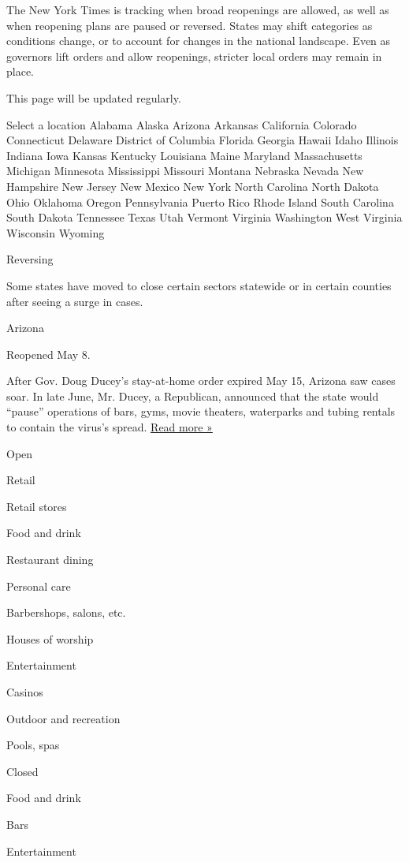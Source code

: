 The New York Times is tracking when broad reopenings are allowed, as
well as when reopening plans are paused or reversed. States may shift
categories as conditions change, or to account for changes in the
national landscape. Even as governors lift orders and allow reopenings,
stricter local orders may remain in place.

This page will be updated regularly.

Select a location Alabama Alaska Arizona Arkansas California Colorado
Connecticut Delaware District of Columbia Florida Georgia Hawaii Idaho
Illinois Indiana Iowa Kansas Kentucky Louisiana Maine Maryland
Massachusetts Michigan Minnesota Mississippi Missouri Montana Nebraska
Nevada New Hampshire New Jersey New Mexico New York North Carolina North
Dakota Ohio Oklahoma Oregon Pennsylvania Puerto Rico Rhode Island South
Carolina South Dakota Tennessee Texas Utah Vermont Virginia Washington
West Virginia Wisconsin Wyoming

Reversing

Some states have moved to close certain sectors statewide or in certain
counties after seeing a surge in cases.

Arizona

Reopened May 8.

After Gov. Doug Ducey's stay-at-home order expired May 15, Arizona saw
cases soar. In late June, Mr. Ducey, a Republican, announced that the
state would ``pause'' operations of bars, gyms, movie theaters,
waterparks and tubing rentals to contain the virus's spread.
\href{https://www.azcentral.com/story/news/local/arizona-health/2020/07/23/watch-live-ducey-provide-arizona-covid-19-update/5490927002/}{Read
more »}

Open

Retail

Retail stores

Food and drink

Restaurant dining

Personal care

Barbershops, salons, etc.

Houses of worship

Entertainment

Casinos

Outdoor and recreation

Pools, spas

Closed

Food and drink

Bars

Entertainment

